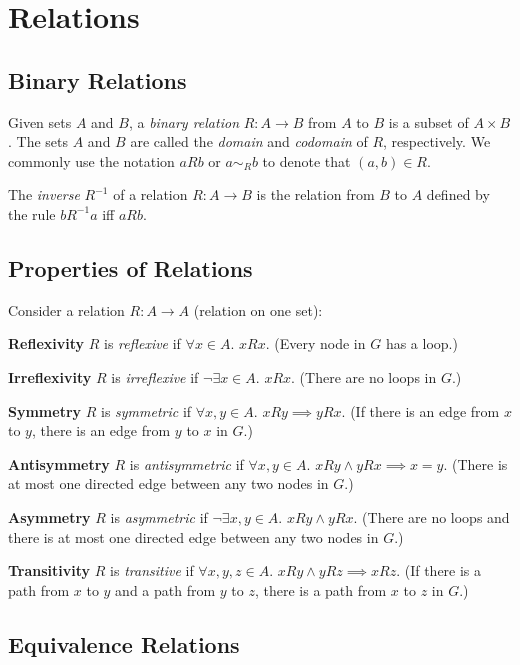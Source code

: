 \documentclass[../main.tex]{subfiles}
\begin{document}
\section{Relations}

\subsection{Binary Relations}

Given sets $A$ and $B$, a \textit{binary relation} $R : A \to B$ from $A$
to $B$ is a subset of $A \times B$. The sets $A$ and $B$ are called the \textit{domain} and \textit{codomain} of $R$, respectively. We commonly use the notation $aRb$ or $a \sim _R b$ to denote that $(a,b) \in R$.

The \textit{inverse} $R^{-1}$ of a relation $R : A \to B$ is the relation from $B$ to $A$ defined by the rule $bR^{-1}a$ iff $aRb$.

\subsection{Properties of Relations}

Consider a relation $R : A \to A$ (relation on one set):

\textbf{Reflexivity} $R$ is \textit{reflexive} if $\forall x \in A$. $xRx$. (Every node in $G$ has a loop.)

\textbf{Irreflexivity} $R$ is \textit{irreflexive} if $\neg\exists x \in A$. $xRx$. (There are no loops in $G$.)

\textbf{Symmetry} $R$ is \textit{symmetric} if $\forall x, y \in A$. $xRy \implies yRx$. (If there is an edge from $x$ to $y$, there is an edge from $y$ to $x$ in $G$.)

\textbf{Antisymmetry} $R$ is \textit{antisymmetric} if $\forall x, y \in A$. $xRy \land yRx \implies x = y$. (There is at most one directed edge between any two nodes in $G$.)

\textbf{Asymmetry} $R$ is \textit{asymmetric} if $\neg\exists x, y \in A$. $xRy \land  yRx$. (There are no loops and there is at most one directed edge between any two nodes in $G$.)

\textbf{Transitivity} $R$ is \textit{transitive} if $\forall x, y, z \in A$. $xRy \land yRz \implies xRz$. (If there is a path from $x$ to $y$ and a path from $y$ to $z$, there is a path from $x$ to $z$ in $G$.)

\subsection{Equivalence Relations}
\end{document}
